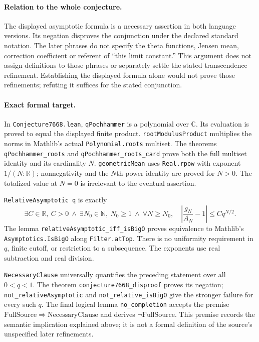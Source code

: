 \documentclass[11pt]{article}
\newcommand{\R}{\mathbb{R}}
\newcommand{\C}{\mathbb{C}}
\begin{document}
\newpage
\raggedright
\paragraph{Relation to the whole conjecture.}
The displayed asymptotic formula is a necessary assertion in both language
versions. Its negation disproves the conjunction under the declared standard
notation. The later phrases do not specify the theta functions, Jensen mean,
correction coefficient or referent of ``this limit constant.'' This argument
does not assign definitions to those phrases or separately settle the stated
transcendence refinement. Establishing the displayed formula alone would
not prove those refinements; refuting it suffices for the stated conjunction.


\paragraph{Exact formal target.}
In \texttt{Conjecture7668.lean}, \texttt{qPochhammer} is a polynomial over
$\C$. Its evaluation is proved to equal the displayed finite product.
\texttt{rootModulusProduct} multiplies the norms in Mathlib's actual
\texttt{Polynomial.roots} multiset. The theorems
\texttt{qPochhammer\_roots} and \texttt{qPochhammer\_roots\_card}
prove both the full multiset identity and its cardinality $N$.
\texttt{geometricMean} uses \texttt{Real.rpow} with exponent $1/(N:\R)$;
nonnegativity and the $N$th-power identity are proved for $N>0$.
The totalized value at $N=0$ is irrelevant to the eventual assertion.

\texttt{RelativeAsymptotic q} is exactly
\[
 \exists C\in\R,\ C>0\ \land\ \exists N_0\in\mathbb N,\ N_0\ge1\ \land\
 \forall N\ge N_0,\quad
 \left|\frac{g_N}{A_N}-1\right|\le Cq^{N/2}.
\]
The lemma \texttt{relativeAsymptotic\_iff\_isBigO} proves equivalence
to Mathlib's \texttt{Asymptotics.IsBigO} along \texttt{Filter.atTop}.
There is no uniformity requirement in $q$, finite cutoff, or restriction to a
subsequence. The exponents use real subtraction and real division.

\texttt{NecessaryClause} universally quantifies the preceding statement
over all $0<q<1$. The theorem \texttt{conjecture7668\_disproof} proves its
negation; \texttt{not\_relativeAsymptotic} and
\texttt{not\_relative\_isBigO} give the stronger failure for every such $q$.
The final logical lemma \texttt{no\_completion} accepts the premise
$\mathrm{FullSource}\Rightarrow\mathrm{NecessaryClause}$ and derives
$\neg\mathrm{FullSource}$. This premise records the semantic implication
explained above; it is not a formal definition of the source's unspecified
later refinements.
\end{document}
